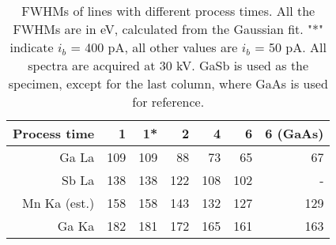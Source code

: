 \begin{table}[hbtp]
    \begin{center}
        \caption{
            FWHMs of lines with different process times.
            All the FWHMs are in eV, calculated from the Gaussian fit.
            "*" indicate $i_b$ = 400 pA, all other values are $i_b$ = 50 pA.
            All spectra are acquired at 30 kV.
            GaSb is used as the specimen, except for the last column, where GaAs is used for reference.
        }
        \renewcommand*{\arraystretch}{1.4}
        \label{tab:results:PTvsFWHMs}
        \begin{tabular}{rrrrrrr}
            \hline
            \textbf{Process time} & \textbf{1} & \textbf{1*} & \textbf{2} & \textbf{4} & \textbf{6} & \textbf{6 (GaAs)} \\
            \hline
            Ga La                 & 109        & 109         & 88         & 73         & 65         & 67                \\
            Sb La                 & 138        & 138         & 122        & 108        & 102        & -                 \\
            Mn Ka (est.)          & 158        & 158         & 143        & 132        & 127        & 129               \\
            Ga Ka                 & 182        & 181         & 172        & 165        & 161        & 163               \\
            \hline
        \end{tabular}
    \end{center}
\end{table}

